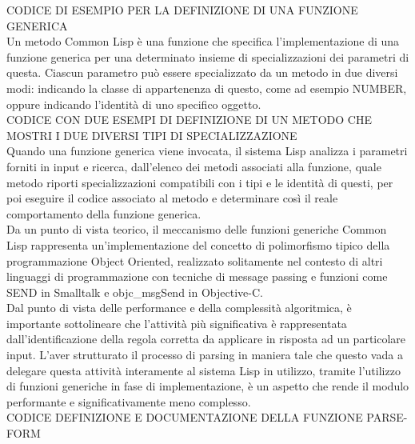 CODICE DI ESEMPIO PER LA DEFINIZIONE DI UNA FUNZIONE GENERICA\\

Un metodo Common Lisp è una funzione che specifica l’implementazione di una
funzione generica per una determinato insieme di specializzazioni dei
parametri di questa. Ciascun parametro può essere specializzato da un metodo
in due diversi modi: indicando la classe di appartenenza di questo, come ad
esempio NUMBER, oppure indicando l’identità di uno specifico oggetto.\\

CODICE CON DUE ESEMPI DI DEFINIZIONE DI UN METODO CHE MOSTRI I DUE DIVERSI
TIPI DI SPECIALIZZAZIONE\\

Quando una funzione generica viene invocata, il sistema Lisp analizza i
parametri forniti in input e ricerca, dall’elenco dei metodi associati alla
funzione, quale metodo riporti specializzazioni compatibili con i tipi e le
identità di questi, per poi eseguire il codice associato al metodo e
determinare così il reale comportamento della funzione generica.\\

Da un punto di vista teorico, il meccanismo delle funzioni generiche Common
Lisp rappresenta un’implementazione del concetto di polimorfismo tipico della
programmazione Object Oriented, realizzato solitamente nel contesto di altri
linguaggi di programmazione con tecniche di message passing e funzioni come
SEND in Smalltalk e objc\_msgSend in Objective-C.\\

Dal punto di vista delle performance e della complessità algoritmica, è
importante sottolineare che l’attività più significativa è rappresentata
dall’identificazione della regola corretta da applicare in risposta ad un
particolare input. L’aver strutturato il processo di parsing in maniera tale
che questo vada a delegare questa attività interamente al sistema Lisp in
utilizzo, tramite l’utilizzo di funzioni generiche in fase di implementazione,
è un aspetto che rende il modulo performante e significativamente meno
complesso.\\

CODICE DEFINIZIONE E DOCUMENTAZIONE DELLA FUNZIONE PARSE-FORM\\

